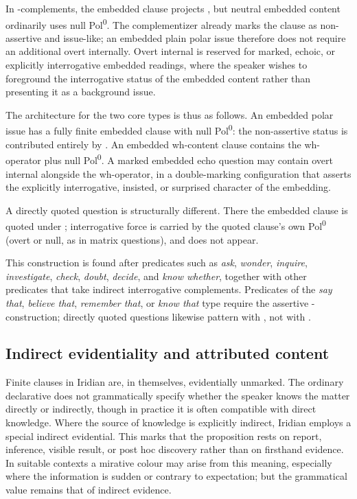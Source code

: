 In -complements, the embedded clause projects , but
neutral embedded content ordinarily uses null Pol\textsuperscript{0}. The
complementizer  already marks the clause as non-assertive and
issue-like; an embedded plain polar issue therefore does not require an
additional overt  internally. Overt internal  is reserved for
marked, echoic, or explicitly interrogative embedded readings, where the speaker
wishes to foreground the interrogative status of the embedded content rather
than presenting it as a background issue.

The architecture for the two core types is thus as follows. An embedded polar
issue has a fully finite embedded clause with null Pol\textsuperscript{0}: the
non-assertive status is contributed entirely by . An embedded
wh-content clause contains the wh-operator plus null Pol\textsuperscript{0}. A
marked embedded echo question may contain overt internal  alongside the
wh-operator, in a double-marking configuration that asserts the explicitly
interrogative, insisted, or surprised character of the embedding.

A directly quoted question is structurally different. There the
embedded clause is quoted under ; interrogative force is carried by the
quoted clause's own Pol\textsuperscript{0} (overt  or null, as in
matrix questions), and  does not appear.

This construction is found after predicates such as \textit{ask},
\textit{wonder}, \textit{inquire}, \textit{investigate}, \textit{check},
\textit{doubt}, \textit{decide}, and \textit{know whether}, together with other
predicates that take indirect interrogative complements. Predicates of the
\textit{say that}, \textit{believe that}, \textit{remember that}, or
\textit{know that} type require the assertive -construction; directly
quoted questions likewise pattern with , not with .

\subsection{Indirect evidentiality and attributed content}
\label{sec:complex-evidential}

Finite clauses in Iridian are, in themselves, evidentially unmarked. The
ordinary declarative does not grammatically specify whether the speaker knows
the matter directly or indirectly, though in practice it is often compatible
with direct knowledge. Where the source of knowledge is explicitly indirect,
Iridian employs a special indirect evidential. This marks that the proposition
rests on report, inference, visible result, or post hoc discovery rather than on
firsthand evidence. In suitable contexts a mirative colour may arise from this
meaning, especially where the information is sudden or contrary to expectation;
but the grammatical value remains that of indirect evidence.


